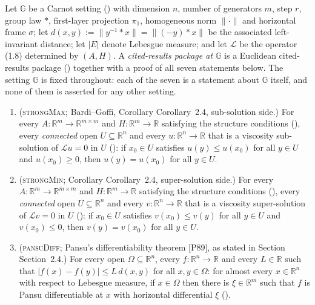 \begin{definition}
Let $\mathbb G$ be a Carnot setting () with dimension $n$, number of
generators $m$, step $r$, group law $*$, first-layer projection $\pi_1$, homogeneous norm
$\|\cdot\|$ and horizontal frame $\sigma$; let $d(x,y):=\|y^{-1}*x\|=\|(-y)*x\|$ be the
associated left-invariant distance; let $|E|$ denote Lebesgue measure; and let $\mathcal L$
be the operator (1.8) determined by $(A,H)$. A \emph{cited-results package at
$\mathbb G$} is a Euclidean cited-results package () together
with a proof of all seven statements below. The setting $\mathbb G$ is fixed throughout: each
of the seven is a statement about $\mathbb G$ itself, and none of them is asserted for any
other setting.

\begin{enumerate}
\item (\textsc{strongMax}; Bardi--Goffi, Corollary Corollary~2.4, sub-solution side.) For every
  $A:\mathbb R^{m}\to\mathbb R^{m\times m}$ and
  $H:\mathbb R^{m}\to\mathbb R$ satisfying the structure conditions
  (), every \emph{connected} open
  $U\subseteq\mathbb R^{n}$ and every $u:\mathbb R^{n}\to\mathbb R$ that is a viscosity
  sub-solution of $\mathcal Lu=0$ in $U$ (): if $x_0\in U$ satisfies
  $u(y)\le u(x_0)$ for all $y\in U$ and $u(x_0)\ge0$, then $u(y)=u(x_0)$ for all $y\in U$.

\item (\textsc{strongMin}; Corollary Corollary~2.4, super-solution side.) For every
  $A:\mathbb R^{m}\to\mathbb R^{m\times m}$ and
  $H:\mathbb R^{m}\to\mathbb R$ satisfying the structure conditions
  (), every \emph{connected} open
  $U\subseteq\mathbb R^{n}$ and every $v:\mathbb R^{n}\to\mathbb R$ that is a viscosity
  super-solution of $\mathcal Lv=0$ in $U$ (): if $x_0\in U$
  satisfies $v(x_0)\le v(y)$ for all $y\in U$ and $v(x_0)\le0$, then $v(y)=v(x_0)$ for all
  $y\in U$.

\item (\textsc{pansuDiff}; Pansu's differentiability theorem [P89], as stated in
  Section Section~2.4.) For every open $\Omega\subseteq\mathbb R^{n}$,
  every $f:\mathbb R^{n}\to\mathbb R$ and every $L\in\mathbb R$ such that
  $|f(x)-f(y)|\le L\,d(x,y)$ for all $x,y\in\Omega$: for almost every $x\in\mathbb R^{n}$
  with respect to Lebesgue measure, if $x\in\Omega$ then there is $\xi\in\mathbb R^{m}$ such
  that $f$ is Pansu differentiable at $x$ with horizontal differential $\xi$
  ().


\end{enumerate}
\end{definition}
